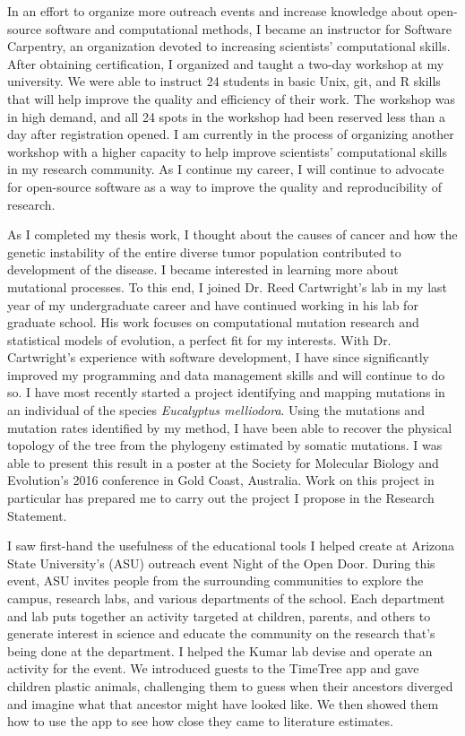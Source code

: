 \documentclass[12pt]{article}
\begin{document}
In an effort to organize more outreach events and increase knowledge about open-source software and computational methods, I became an instructor for Software Carpentry, an organization devoted to increasing scientists' computational skills. After obtaining certification, I organized and taught a two-day workshop at my university. We were able to instruct 24 students in basic Unix, git, and R skills that will help improve the quality and efficiency of their work. The workshop was in high demand, and all 24 spots in the workshop had been reserved less than a day after registration opened. I am currently in the process of organizing another workshop with a higher capacity to help improve scientists' computational skills in my research community.
As I continue my career, I will continue to advocate for open-source software as a way to improve the quality and reproducibility of research.

As I completed my thesis work, I thought about the causes of cancer and how the genetic instability of the entire diverse tumor population contributed to development of the disease. I became interested in learning more about mutational processes. To this end, I joined Dr. Reed Cartwright's lab in my last year of my undergraduate career and have continued working in his lab for graduate school. His work focuses on computational mutation research and statistical models of evolution, a perfect fit for my interests. With Dr. Cartwright's experience with software development, I have since significantly improved my programming and data management skills and will continue to do so. I have most recently started a project identifying and mapping mutations in an individual of the species \textit{Eucalyptus melliodora}. Using the mutations and mutation rates identified by my method, 
I have been able to recover the physical topology of the tree from the phylogeny estimated by somatic mutations. I was able to present this result in a poster at the Society for Molecular Biology and Evolution's 2016 conference in Gold Coast, Australia.
Work on this project in particular has prepared me to carry out the project I propose in the Research Statement.

I saw first-hand the usefulness of the educational tools I helped create at Arizona State University's (ASU)
outreach event Night of the Open Door. During this event, ASU invites people from the surrounding communities to explore the campus, research labs, and various departments of the school. Each department and lab puts together an activity targeted at children, parents, and others to generate interest in science and educate the community on the research that's being done at the department. I helped the Kumar lab devise and operate an activity for the event. We introduced guests to the TimeTree app and gave children plastic animals, challenging them to guess when their ancestors diverged and imagine what that ancestor might have looked like. We then showed them how to use the app to see how close they came to literature estimates.
\end{document}
